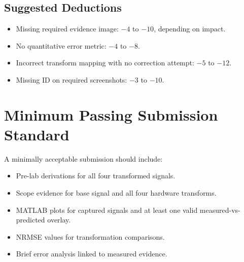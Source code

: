 \documentclass[11pt,letterpaper]{article}
\begin{document}
\subsection*{Suggested Deductions}
\begin{itemize}[leftmargin=1.2em]
    \item Missing required evidence image: \(-4\) to \(-10\), depending on impact.
    \item No quantitative error metric: \(-4\) to \(-8\).
    \item Incorrect transform mapping with no correction attempt: \(-5\) to \(-12\).
    \item Missing ID on required screenshots: \(-3\) to \(-10\).
\end{itemize}

\section{Minimum Passing Submission Standard}
A minimally acceptable submission should include:
\begin{itemize}[leftmargin=1.2em]
    \item Pre-lab derivations for all four transformed signals.
    \item Scope evidence for base signal and all four hardware transforms.
    \item MATLAB plots for captured signals and at least one valid measured-vs-predicted overlay.
    \item NRMSE values for transformation comparisons.
    \item Brief error analysis linked to measured evidence.
\end{itemize}
\end{document}
